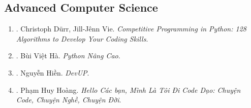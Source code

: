 \documentclass{article}
\begin{document}

\subsection{Advanced Computer Science}

\begin{enumerate}
	\item \cite{Durr_Vie2021}. Christoph D\"urr, Jill-J\^enn Vie. \textit{Competitive Programming in Python: 128 Algorithms to Develop Your Coding Skills}.\\\mbox{}\hfill{}
	\item \cite{Ha_Python_nang_cao}. Bùi Việt Hà. \textit{Python Nâng Cao}.\hfill{}
	\item \cite{Hien_DevUp}. Nguyễn Hiền. \textit{DevUP}.\hfill{}
	\item \cite{Hoang_2022}. Phạm Huy Hoàng. \textit{Hello Các bạn, Mình Là Tôi Đi Code Dạo: Chuyện Code, Chuyện Nghề, Chuyện Đời}.\\\mbox{}\hfill{}
	

\end{enumerate}
\end{document}
